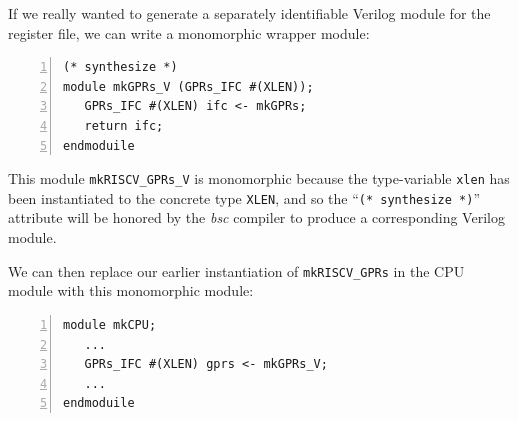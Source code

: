 If we really wanted to generate a separately identifiable Verilog
module for the register file, we can write a monomorphic wrapper
module:

{\footnotesize
\begin{Verbatim}[frame=single, numbers=left]
(* synthesize *)
module mkGPRs_V (GPRs_IFC #(XLEN));
   GPRs_IFC #(XLEN) ifc <- mkGPRs;
   return ifc;
endmoduile
\end{Verbatim}
}

This module {\tt mkRISCV\_GPRs\_V} is monomorphic because the
type-variable {\tt xlen} has been instantiated to the concrete type
{\tt XLEN}, and so the ``{\tt (* synthesize *)}'' attribute will be
honored by the \emph{bsc} compiler to produce a corresponding Verilog
module.

We can then replace our earlier instantiation of {\tt mkRISCV\_GPRs}
in the CPU module with this monomorphic module:

{\footnotesize
\begin{Verbatim}[frame=single, numbers=left]
module mkCPU;
   ...
   GPRs_IFC #(XLEN) gprs <- mkGPRs_V;
   ...
endmoduile
\end{Verbatim}
}



